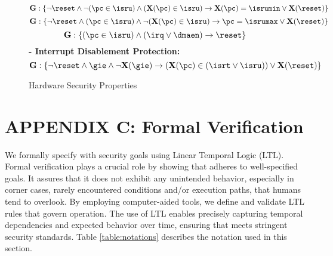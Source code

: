 \begin{figure*}[t]
\begin{mdframed}[userdefinedwidth=0.95\textwidth]
\begin{equation}
            \textbf{G}: \{\neg \reset \land \neg (\pc \in \isru) \land (\textbf{X}(\pc) \in \isru) \rightarrow \textbf{X}(\pc) = \isrumin \lor \textbf{X}(\reset) \}
        \end{equation}
        \begin{equation}\label{eq:uart-isr-protection2}
            \textbf{G}: \{\neg \reset \land (\pc \in \isru) \land \neg (\textbf{X}(\pc) \in \isru) \rightarrow \pc = \isrumax \lor \textbf{X}(\reset) \}            
        \end{equation}
        \begin{equation}\label{eq:uart-isr-protection3}
            \textbf{G}: \{(\pc \in \isru) \land (\irq \lor \dmaen) \rightarrow \reset \}
        \end{equation}
        \textbf{- \small Interrupt Disablement Protection:}
        \begin{equation}\label{eq:irq-disablement-protection}
            \textbf{G}: \{\neg \reset \land \gie \land \neg \textbf{X}(\gie) \rightarrow (\textbf{X}(\pc) \in (\isrt \lor \isru)) \lor \textbf{X}(\reset)\}
        \end{equation}        
    \end{mdframed}
    \caption{\trapscasu Hardware Security Properties}\label{fig:hwprop}
\end{figure*}

\section*{APPENDIX C: \trapscasu Formal Verification} \label{sec:formal-verification}

We formally specify \trapscasu with \trapsnortc security goals using Linear Temporal Logic (LTL).
Formal verification plays a crucial role by showing that \trapscasu adheres to well-specified goals.
It assures that it does not exhibit any unintended behavior, especially in corner cases, 
rarely encountered conditions and/or execution paths, that humans tend to overlook.
By employing computer-aided tools, we define and validate LTL rules that govern \trapscasu operation.
The use of LTL enables precisely capturing temporal dependencies and expected behavior 
over time, ensuring that \trapscasu meets stringent security standards.
Table \ref{table:notations} describes the notation used in this section.

